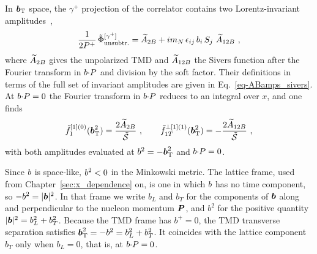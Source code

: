 In $\boldsymbol{b}_{\mathrm T}$ space, the $\gamma^+$ projection of the correlator contains two Lorentz-invariant amplitudes~\cite{Musch:2011er},
\begin{equation}
  \frac{1}{2P^+}\,\tilde\Phi^{[\gamma^+]}_{\text{unsubtr.}} = \widetilde{A}_{2B} + im_N\,\epsilon_{ij}\,b_i\,S_j\ \widetilde{A}_{12B} \ ,
  \label{eq:gamma_plus_amplitudes}
\end{equation}
where $\widetilde{A}_{2B}$ gives the unpolarized TMD and $\widetilde{A}_{12B}$ the Sivers function after the Fourier transform in $b{\cdot} P$ and division by the soft factor. Their definitions in terms of the full set of invariant amplitudes are given in Eq.~\eqref{eq-ABamps_sivers}. At $b{\cdot} P = 0$ the Fourier transform in $b{\cdot} P$ reduces to an integral over $x$, and one finds~\cite{Musch:2011er}
\begin{equation}
  \tilde f_1^{[1](0)}(\boldsymbol{b}_{\mathrm T}^2) = \frac{2\widetilde{A}_{2B}}{\tilde{\mathcal{S}}}\ ,\qquad
  \tilde f_{1T}^{\perp[1](1)}(\boldsymbol{b}_{\mathrm T}^2) = -\frac{2\widetilde{A}_{12B}}{\tilde{\mathcal{S}}}\ ,
\end{equation}
with both amplitudes evaluated at $b^2 = -\boldsymbol{b}_{\mathrm T}^2$ and $b{\cdot} P = 0$.

Since $b$ is space-like, $b^2<0$ in the Minkowski metric. The lattice frame, used from Chapter~\ref{sec:x_dependence} on, is one in which $b$ has no time component, so $-b^2 = |\boldsymbol{b}|^2$. In that frame we write $b_L$ and $b_T$ for the components of $\boldsymbol{b}$ along and perpendicular to the nucleon momentum $\boldsymbol{P}$, and $b^2$ for the positive quantity $|\boldsymbol{b}|^2 = b_L^2 + b_T^2$. Because the TMD frame has $b^+=0$, the TMD transverse separation satisfies $\boldsymbol{b}_{\mathrm T}^2 = -b^2 = b_L^2 + b_T^2$. It coincides with the lattice component $b_T$ only when $b_L = 0$, that is, at $b{\cdot} P = 0$.

